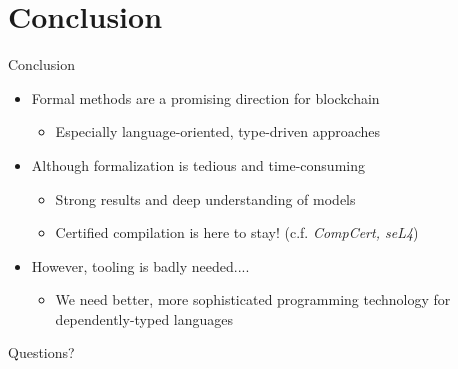 \documentclass[aspectratio=43]{beamer}
\begin{document}
\section{Conclusion}
\begin{frame}{Conclusion}
\begin{itemize}
\item Formal methods are a promising direction for blockchain
  \begin{itemize}
  \item Especially language-oriented, type-driven approaches
  \end{itemize}
\item Although formalization is tedious and time-consuming
  \begin{itemize}
  \item Strong results and deep understanding of models
  \item Certified compilation is here to stay! (c.f. \textit{CompCert, seL4})
  \end{itemize}
\item However, tooling is badly needed....
  \begin{itemize}
  \item We need better, more sophisticated programming technology
    for dependently-typed languages
  \end{itemize}
\end{itemize}
\end{frame}

\begin{frame}[standout]
  Questions?
\end{frame}
\end{document}

